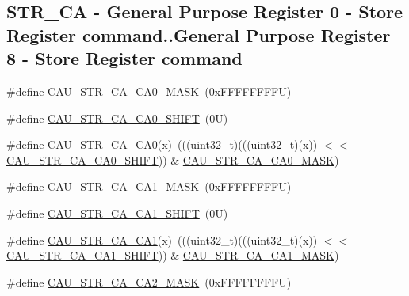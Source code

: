 \subsection*{S\+T\+R\+\_\+\+CA -\/ General Purpose Register 0 -\/ Store Register command..General Purpose Register 8 -\/ Store Register command}
\begin{DoxyCompactItemize}
\item 
\#define \mbox{\hyperlink{group___c_a_u___register___masks_ga7490044c911fb60ad77baacec88b73a0}{C\+A\+U\+\_\+\+S\+T\+R\+\_\+\+C\+A\+\_\+\+C\+A0\+\_\+\+M\+A\+SK}}~(0x\+F\+F\+F\+F\+F\+F\+F\+F\+U)
\item 
\#define \mbox{\hyperlink{group___c_a_u___register___masks_ga80d0808b0ed4fd4b825e2409ecc79ce7}{C\+A\+U\+\_\+\+S\+T\+R\+\_\+\+C\+A\+\_\+\+C\+A0\+\_\+\+S\+H\+I\+FT}}~(0\+U)
\item 
\#define \mbox{\hyperlink{group___c_a_u___register___masks_ga499b6aa3c87a5c219ee34ffec4b8c807}{C\+A\+U\+\_\+\+S\+T\+R\+\_\+\+C\+A\+\_\+\+C\+A0}}(x)~(((uint32\+\_\+t)(((uint32\+\_\+t)(x)) $<$$<$ \mbox{\hyperlink{group___c_a_u___register___masks_ga80d0808b0ed4fd4b825e2409ecc79ce7}{C\+A\+U\+\_\+\+S\+T\+R\+\_\+\+C\+A\+\_\+\+C\+A0\+\_\+\+S\+H\+I\+FT}})) \& \mbox{\hyperlink{group___c_a_u___register___masks_ga7490044c911fb60ad77baacec88b73a0}{C\+A\+U\+\_\+\+S\+T\+R\+\_\+\+C\+A\+\_\+\+C\+A0\+\_\+\+M\+A\+SK}})
\item 
\#define \mbox{\hyperlink{group___c_a_u___register___masks_gaf5468a65fe021f5053a4d9fa83c77614}{C\+A\+U\+\_\+\+S\+T\+R\+\_\+\+C\+A\+\_\+\+C\+A1\+\_\+\+M\+A\+SK}}~(0x\+F\+F\+F\+F\+F\+F\+F\+F\+U)
\item 
\#define \mbox{\hyperlink{group___c_a_u___register___masks_gaf733a0f562c8ff07f24843f2971c85ed}{C\+A\+U\+\_\+\+S\+T\+R\+\_\+\+C\+A\+\_\+\+C\+A1\+\_\+\+S\+H\+I\+FT}}~(0\+U)
\item 
\#define \mbox{\hyperlink{group___c_a_u___register___masks_gac941842d240ab2902d1589d14f016339}{C\+A\+U\+\_\+\+S\+T\+R\+\_\+\+C\+A\+\_\+\+C\+A1}}(x)~(((uint32\+\_\+t)(((uint32\+\_\+t)(x)) $<$$<$ \mbox{\hyperlink{group___c_a_u___register___masks_gaf733a0f562c8ff07f24843f2971c85ed}{C\+A\+U\+\_\+\+S\+T\+R\+\_\+\+C\+A\+\_\+\+C\+A1\+\_\+\+S\+H\+I\+FT}})) \& \mbox{\hyperlink{group___c_a_u___register___masks_gaf5468a65fe021f5053a4d9fa83c77614}{C\+A\+U\+\_\+\+S\+T\+R\+\_\+\+C\+A\+\_\+\+C\+A1\+\_\+\+M\+A\+SK}})
\item 
\#define \mbox{\hyperlink{group___c_a_u___register___masks_ga7a41f2c437556c9a48ed99cd8607a9f9}{C\+A\+U\+\_\+\+S\+T\+R\+\_\+\+C\+A\+\_\+\+C\+A2\+\_\+\+M\+A\+SK}}~(0x\+F\+F\+F\+F\+F\+F\+F\+F\+U)

\end{DoxyCompactItemize}
